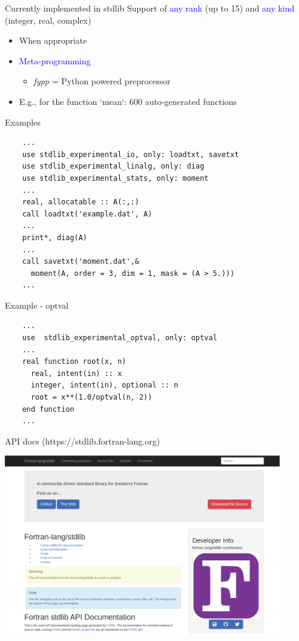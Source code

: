 \documentclass{beamer}
\begin{document}
\begin{frame}[c]{Currently implemented in stdlib}
	Support of \textcolor{blue}{any rank} (up to 15) and \textcolor{blue}{any kind}
	(\textcolor{mygreen}{integer}, \textcolor{mygreen}{real}, \textcolor{mygreen}{complex})
	\begin{itemize}
		\item When appropriate
		\item \textcolor{blue}{Meta-programming}
		\begin{itemize}
			\item \textit{fypp} = Python powered preprocessor
		\end{itemize}
		\item E.g., for the function `mean`: 600 auto-generated functions
	\end{itemize}
\end{frame}

\begin{frame}[fragile]{Examples}
	\begin{lstlisting}
	...
	use stdlib_experimental_io, only: loadtxt, savetxt
	use stdlib_experimental_linalg, only: diag
	use stdlib_experimental_stats, only: moment
	...
	real, allocatable :: A(:,:)
	call loadtxt('example.dat', A)
	...
	print*, diag(A)
	...
 	call savetxt('moment.dat',&
	  moment(A, order = 3, dim = 1, mask = (A > 5.)))
	...	\end{lstlisting}
\end{frame}


\begin{frame}[fragile]{Example - optval}
	\begin{lstlisting}
	...
	use  stdlib_experimental_optval, only: optval
	...
	real function root(x, n)
	  real, intent(in) :: x
	  integer, intent(in), optional :: n
	  root = x**(1.0/optval(n, 2))
	end function
	...	\end{lstlisting}
\end{frame}


\begin{frame}[c]{API docs (https://stdlib.fortran-lang.org)}
	\begin{center}
	\includegraphics[width=0.9\textwidth]{apidocsstdlib}
	\end{center}
\end{frame}
\end{document}
